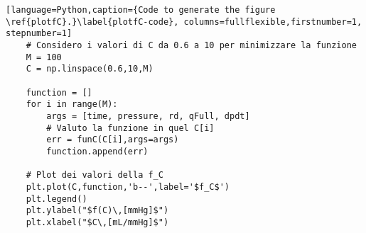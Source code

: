 \begin{lstlisting}[language=Python,caption={Code to generate the figure \ref{plotfC}.}\label{plotfC-code}, columns=fullflexible,firstnumber=1, stepnumber=1]
    # Considero i valori di C da 0.6 a 10 per minimizzare la funzione
    M = 100
    C = np.linspace(0.6,10,M)

    function = []
    for i in range(M):
        args = [time, pressure, rd, qFull, dpdt]
        # Valuto la funzione in quel C[i]
        err = funC(C[i],args=args)
        function.append(err)

    # Plot dei valori della f_C
    plt.plot(C,function,'b--',label='$f_C$')
    plt.legend()
    plt.ylabel("$f(C)\,[mmHg]$")
    plt.xlabel("$C\,[mL/mmHg]$")
\end{lstlisting}